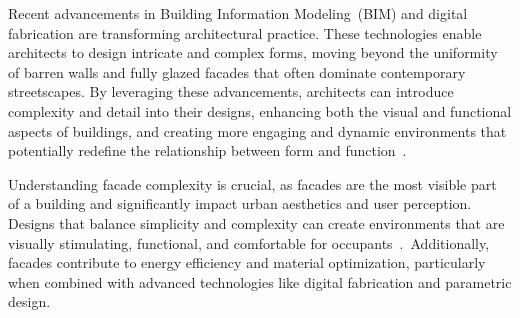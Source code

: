 



Recent advancements in Building Information Modeling~(BIM) and digital fabrication are transforming architectural practice.
These technologies enable architects to design intricate and complex forms, moving beyond the uniformity of barren walls and fully glazed facades that often dominate contemporary streetscapes.
By leveraging these advancements, architects can introduce complexity and detail into their designs, enhancing both the visual and functional aspects of buildings, and creating more engaging and dynamic environments that potentially redefine the relationship between form and function~\cite{Leach2016}.


Understanding facade complexity is crucial, as facades are the most visible part of a building and significantly impact urban aesthetics and user perception.
Designs that balance simplicity and complexity can create environments that are visually stimulating, functional, and comfortable for occupants~\cite{Browning2014}.~Additionally, facades contribute to energy efficiency and material optimization, particularly when combined with advanced technologies like digital fabrication and parametric design.

